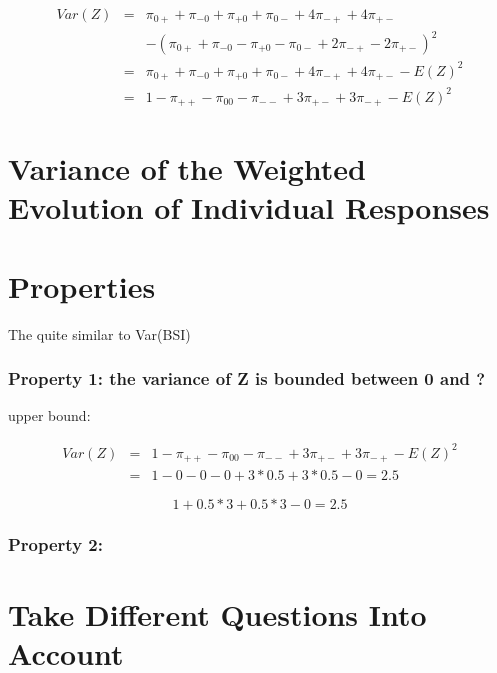 \documentclass[12pt,a4paper,oneside]{book}
\begin{document}

\begin{eqnarray}
Var(Z) &=& \pi_{0+} + \pi_{-0} + \pi_{+0} + \pi_{0-} +4\pi_{-+} +4\pi_{+-} \nonumber \nonumber \\ 
&&    - (\pi_{0+} + \pi_{-0} - \pi_{+0} - \pi_{0-} +2\pi_{-+} -2\pi_{+-})^2  \\
&=& \pi_{0+} + \pi_{-0} + \pi_{+0} + \pi_{0-} +4\pi_{-+} +4\pi_{+-} - E(Z)^2  \\
&=& 1 - \pi_{++} - \pi_{00} - \pi_{--} + 3\pi_{+-} + 3\pi_{-+} - E(Z)^2
\end{eqnarray}




\section{Variance of the Weighted Evolution of Individual Responses}


\section{Properties}

The 
quite similar to Var(BSI)


\subsubsection{Property 1: the variance of Z is bounded between 0 and ?}
upper bound:

\begin{eqnarray}
Var(Z) &=& 1 - \pi_{++} - \pi_{00} - \pi_{--} + 3\pi_{+-} + 3\pi_{-+} - E(Z)^2 \nonumber \\
    &=& 1 - 0 - 0 - 0 + 3*0.5 + 3*0.5 - 0 = 2.5 \nonumber
\end{eqnarray}


\begin{equation}
    1+ 0.5*3 + 0.5*3 - 0 = 2.5
\end{equation}

\subsubsection{Property 2: }

\section{Take Different Questions Into Account}
\end{document}
